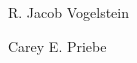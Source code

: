 \documentclass[10pt,journal,cspaper,compsoc]{IEEEtran}
\begin{document}
\begin{IEEEbiographynophoto}{R. Jacob Vogelstein}
\end{IEEEbiographynophoto}

\begin{IEEEbiographynophoto}{Carey E. Priebe}
\end{IEEEbiographynophoto}

\end{document}

